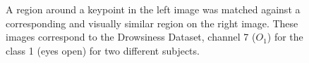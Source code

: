 \documentclass[nouppercase]{ifmbe}
\begin{document}




   
      \begin{figure}[thpb]
      \centering
      \setlength\fboxsep{0pt}
	  \setlength\fboxrule{0.5pt}
      \caption{A region around a keypoint in the left image was matched against a corresponding and visually similar region on the right image. These images correspond to the Drowsiness Dataset, channel 7 ($ O_1 $) for the class 1 (eyes open) for two different subjects.}
      \label{figure3}
   \end{figure}
   
\end{document}
